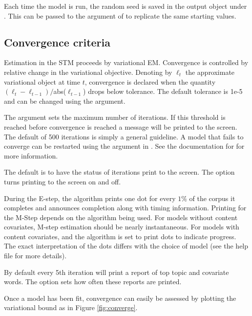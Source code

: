 \documentclass[article,shortnames]{jss}
\begin{document}
Each time the model is run, the random seed is saved in the output object under .  This can be passed to the  argument of  to replicate the same starting values.


\subsection{Convergence criteria}
Estimation in the STM proceeds by variational EM.  Convergence is controlled by relative change in the variational objective.  Denoting by $\ell_t$ the approximate variational object at time $t$, convergence is declared when the quantity $(\ell_t - \ell_{t-1})/$abs($\ell_{t-1}$) drops below tolerance.  The default tolerance is 1e-5 and can be changed using the  argument.

The argument  sets the maximum number of iterations.  If this threshold is reached before convergence is reached a message will be printed to the screen.  The default of 500 iterations is simply a general guideline.  A model that fails to converge can be restarted using the  argument in .  See the documentation for  for more information.

The default is to have the status of iterations print to the screen. The  option turns printing to the screen on and off.

During the E-step, the algorithm prints one dot for every $1\%$ of the corpus it completes and announces completion along with timing information.  Printing for the M-Step depends on the algorithm being used.  For models without content covariates, M-step estimation should be nearly instantaneous.  For models with content covariates, and the algorithm is set to print dots to indicate progress.  The exact interpretation of the dots differs with the choice of model (see the help file for more details).

By default every 5th iteration will print a report of top topic and covariate words.  The  option sets how often these reports are printed.

Once a model has been fit, convergence can easily be assessed by plotting the variational bound as in Figure \ref{fig:converge}.
\end{document}
